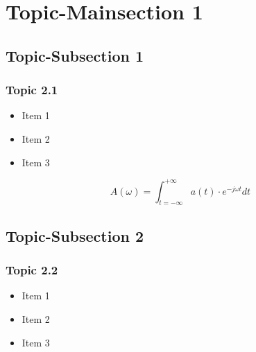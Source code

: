 \documentclass[c]{beamer}
\begin{document}

\section{Topic-Mainsection 1}
\subsection{Topic-Subsection 1}
\begin{frame}[c]
\frametitle{Topic 2.1}

	\begin{itemize}
		\item Item 1
		\item Item 2
		\item Item 3
	\end{itemize}


	\begin{definition}
		\begin{equation}
			A\left(\omega\right)=\int_{t=-\infty}^{+\infty}a\left(t\right)\cdot e^{-j\omega t} dt
		\end{equation}
	\end{definition}
\end{frame}


\subsection{Topic-Subsection 2}
\begin{frame}[c]
\frametitle{Topic 2.2}

	\begin{itemize}
		\item Item 1
		\item Item 2
		\item Item 3
	\end{itemize}


\end{frame}

\end{document}
